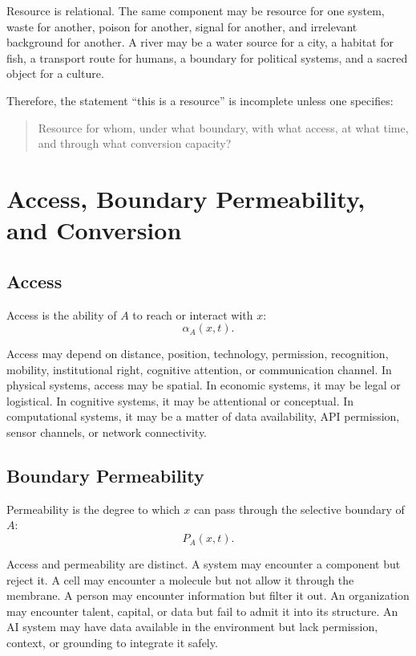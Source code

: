 \documentclass[11pt,a4paper]{article}
\begin{document}
Resource is relational. The same component may be resource for one system, waste for another, poison for another, signal for another, and irrelevant background for another. A river may be a water source for a city, a habitat for fish, a transport route for humans, a boundary for political systems, and a sacred object for a culture.

Therefore, the statement ``this is a resource'' is incomplete unless one specifies:
\begin{quote}
Resource for whom, under what boundary, with what access, at what time, and through what conversion capacity?
\end{quote}

\section{Access, Boundary Permeability, and Conversion}

\subsection{Access}

Access is the ability of $A$ to reach or interact with $x$:
\[
\alpha_A(x,t).
\]

Access may depend on distance, position, technology, permission, recognition, mobility, institutional right, cognitive attention, or communication channel. In physical systems, access may be spatial. In economic systems, it may be legal or logistical. In cognitive systems, it may be attentional or conceptual. In computational systems, it may be a matter of data availability, API permission, sensor channels, or network connectivity.

\subsection{Boundary Permeability}

Permeability is the degree to which $x$ can pass through the selective boundary of $A$:
\[
P_A(x,t).
\]

Access and permeability are distinct. A system may encounter a component but reject it. A cell may encounter a molecule but not allow it through the membrane. A person may encounter information but filter it out. An organization may encounter talent, capital, or data but fail to admit it into its structure. An AI system may have data available in the environment but lack permission, context, or grounding to integrate it safely.
\end{document}
